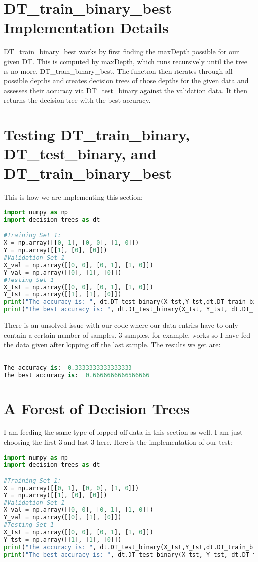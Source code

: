 \documentclass{article}
\begin{document}
\section{DT\_train\_binary\_best Implementation Details}
    DT\_train\_binary\_best works by first finding the maxDepth possible for our given DT. This is computed by maxDepth, which runs recursively until the tree is no more. DT\_train\_binary\_best.
    The function then iterates through all possible depths and creates decision trees of those depths for the given data and assesses their accuracy via DT\_test\_binary against the validation data. It then returns
    the decision tree with the best accuracy.
\section{Testing DT\_train\_binary, DT\_test\_binary, and DT\_train\_binary\_best}
    This is how we are implementing this section:
    \begin{lstlisting}[language=Python, caption=Testing Implementation]
import numpy as np
import decision_trees as dt

#Training Set 1:
X = np.array([[0, 1], [0, 0], [1, 0]])
Y = np.array([[1], [0], [0]])
#Validation Set 1
X_val = np.array([[0, 0], [0, 1], [1, 0]])
Y_val = np.array([[0], [1], [0]])
#Testing Set 1
X_tst = np.array([[0, 0], [0, 1], [1, 0]])
Y_tst = np.array([[1], [1], [0]])
print("The accuracy is: ", dt.DT_test_binary(X_tst,Y_tst,dt.DT_train_binary(X,Y, 2)))
print("The best accuracy is: ", dt.DT_test_binary(X_tst, Y_tst, dt.DT_train_binary_best(X, Y, X_val, Y_val)))
    \end{lstlisting}
    There is an unsolved issue with our code where our data entries have to only contain a certain number of samples. 3 samples, for example, works so I have fed the data given after lopping off the last sample.
    The results we get are:
    \begin{lstlisting}[language=Python, caption=Testing Results]

The accuracy is:  0.3333333333333333
The best accuracy is:  0.6666666666666666

    \end{lstlisting}
\section{A Forest of Decision Trees}
    I am feeding the same type of lopped off data in this section as well. I am just choosing the first 3 and last 3 here. Here is the implementation of our test:
\begin{lstlisting}[language=Python, caption=Testing Implementation]
import numpy as np
import decision_trees as dt

#Training Set 1:
X = np.array([[0, 1], [0, 0], [1, 0]])
Y = np.array([[1], [0], [0]])
#Validation Set 1
X_val = np.array([[0, 0], [0, 1], [1, 0]])
Y_val = np.array([[0], [1], [0]])
#Testing Set 1
X_tst = np.array([[0, 0], [0, 1], [1, 0]])
Y_tst = np.array([[1], [1], [0]])
print("The accuracy is: ", dt.DT_test_binary(X_tst,Y_tst,dt.DT_train_binary(X,Y, 2)))
print("The best accuracy is: ", dt.DT_test_binary(X_tst, Y_tst, dt.DT_train_binary_best(X, Y, X_val, Y_val)))
    \end{lstlisting}
\end{document}
